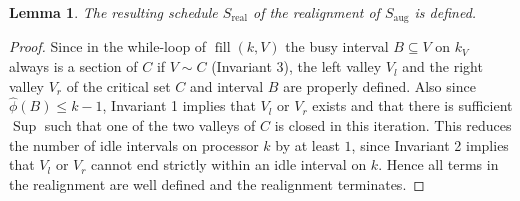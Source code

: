 \documentclass[a4paper]{article}
\DeclareMathOperator{\aug}{aug}
\DeclareMathOperator{\real}{real}
\DeclareMathOperator{\fillop}{fill}
\DeclareMathOperator{\res}{Sup}
\newtheorem{lemma}[theorem]{Lemma}
\begin{document}
\begin{lemma}\label{lemma:s_real}
  The resulting schedule $S_{\real}$ of the realignment of $S_{\aug}$ is defined.
\end{lemma}
\begin{proof}

  Since in the while-loop of $\fillop(k, V)$ the busy interval $B \subseteq V$ on $k_V$ always is a section of $C$ if $V \sim C$ (Invariant 3), the left valley $V_l$ and the right valley $V_r$ of the critical set $C$ and interval $B$ are properly defined.
  Also since $\hat \phi(B) \leq k - 1$, Invariant 1 implies that $V_l$ or $V_r$ exists and that there is sufficient $\res$ such that one of the two valleys of $C$ is closed in this iteration.
  This reduces the number of idle intervals on processor $k$ by at least $1$, since Invariant 2 implies that $V_l$ or $V_r$ cannot end strictly within an idle interval on $k$.
  Hence all terms in the realignment are well defined and the realignment terminates.
\end{proof}
\end{document}
